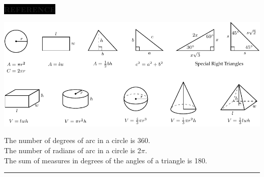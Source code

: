 {\vspace*{0mm}



\hspace*{25mm}
\parbox{15cm}{%
\raggedright
\colorbox{black}{\color{white}\textbf{\small REFERENCE}}\hskip-2pt

\vspace*{4mm}

\includegraphics{support/sat_2016_math_formula_key.pdf}

\vspace*{2mm}

The number of degrees of arc in a circle is 360.\\[1ex]

The number of radians of arc in a circle is 2$\pi$.\\[1ex]

The sum of measures in degrees of the angles of a triangle is 180.}

\vspace*{4mm}

\hrule height 1pt
}

\clearpage

